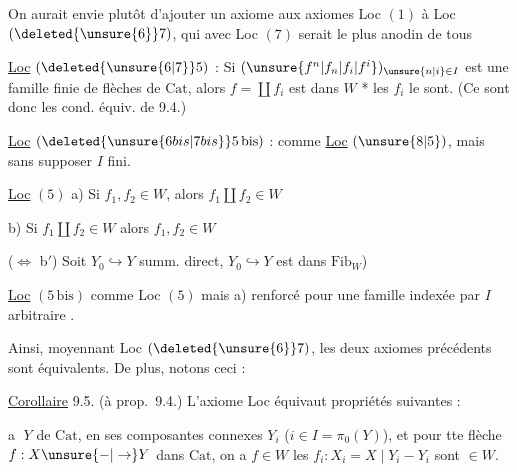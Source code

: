 On aurait envie  plutôt d'ajouter  un axiome aux axiomes Loc $(1)$ à Loc $(\deleted{\unsure{6}}7)$, qui avec Loc $(7)$ serait  le plus anodin de tous


\uline{Loc} $(\deleted{\unsure{6|7}}5)$  : Si $(\unsure{f^n|f_n|f_i|f^i})_{\unsure{n|i}\in I}$ est une famille finie de flèches de $\mathrm{Cat}$, alors $f=\coprod f_i$ est dans $W$ *  les $f_i$ le sont. (Ce sont donc les cond. équiv. de 9.4.)

\uline{Loc} $(\deleted{\unsure{6 bis|7 bis}}5\,\mathrm{bis})$  : comme \uline{Loc} $(\unsure{8|5})$, mais sans supposer $I$ fini.

\uline{Loc} $(5)$ \quad a) Si $f_1,f_2\in W$, alors $f_1\amalg f_2\in W$
\par b) Si $f_1\amalg f_2\in W$ alors $f_1,f_2\in W$
\par ($\Longleftrightarrow$ b$'$) Soit $Y_0\hookrightarrow Y$ summ. direct,
 $Y_0\hookrightarrow Y$ est dans $\mathrm{Fib}_W$)

\uline{Loc} $(5\,\mathrm{bis})$ comme Loc $(5)$ mais a) renforcé  pour une famille  indexée par $I$ arbitraire .

Ainsi, moyennant Loc $(\deleted{\unsure{6}}7)$, les deux axiomes précédents sont équivalents. De plus, notons ceci :

 \uline{Corollaire} 9.5. (à prop.~9.4.) L'axiome Loc  équivaut  propriétés suivantes : 

\textcircled{a}  $Y$ de $\mathrm{Cat}$,  en ses composantes connexes $Y_i$ ($i\in I=\pi_0(Y)$),  et pour tte flèche $f:X\unsure{-|\to}Y$ dans $\mathrm{Cat}$, on a $f\in W$  les $f_i:X_i=X\mid Y_i-Y_i$ sont $\in W$.

